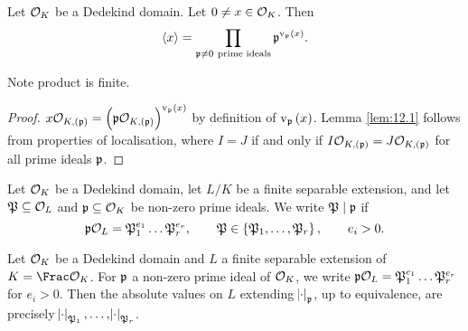 
\begin{lemma}
\label{lem:12.1}
Let $ \mathcal{O}_K $ be a Dedekind domain. Let $ 0 \ne x \in \mathcal{O}_K $. Then
$$ \abr{x} = \prod_{\ppp \ne 0 \ \text{prime ideals}} \ppp^{\v_\ppp\br{x}}. $$
\end{lemma}

Note product is finite.

\begin{proof}
$ x\OOO_{K, \br{\ppp}} = \br{\ppp\OOO_{K, \br{\ppp}}}^{\v_\ppp\br{x}} $ by definition of $ \v_\ppp\br{x} $. Lemma \ref{lem:12.1} follows from properties of localisation, where $ I = J $ if and only if $ I\OOO_{K, \br{\ppp}} = J\OOO_{K, \br{\ppp}} $ for all prime ideals $ \mathfrak{p} $.
\end{proof}

\pagebreak

\begin{notation*}
Let $ \mathcal{O}_K $ be a Dedekind domain, let $ L / K $ be a finite separable extension, and let $ \mathfrak{P} \subseteq \mathcal{O}_L $ and $ \mathfrak{p} \subseteq \mathcal{O}_K $ be non-zero prime ideals. We write $ \mathfrak{P} \mid \mathfrak{p} $ if
$$ \ppp\OOO_L = \pp_1^{e_1} \dots \pp_r^{e_r}, \qquad \pp \in \cbr{\pp_1, \dots, \pp_r}, \qquad e_i > 0. $$
\end{notation*}

\begin{theorem}
\label{thm:12.2}
Let $ \mathcal{O}_K $ be a Dedekind domain and $ L $ a finite separable extension of $ K = \Frac \OOO_K $. For $ \mathfrak{p} $ a non-zero prime ideal of $ \mathcal{O}_K $, we write $ \mathfrak{p}\mathcal{O}_L = \mathfrak{P}_1^{e_1} \dots \mathfrak{P}_r^{e_r} $ for $ e_i > 0 $. Then the absolute values on $ L $ extending $ \abs{\cdot}_{\mathfrak{p}} $, up to equivalence, are precisely $ \abs{\cdot}_{\mathfrak{P}_1}, \dots, \abs{\cdot}_{\mathfrak{P}_r} $.
\end{theorem}

